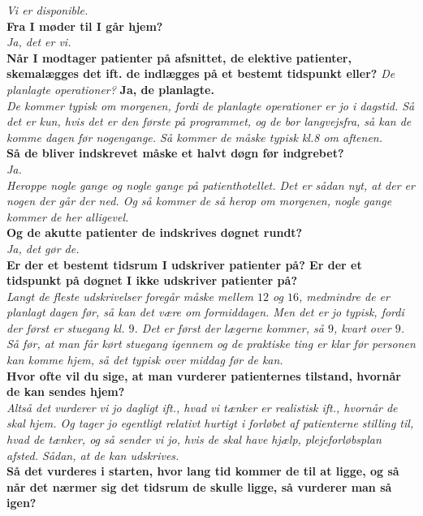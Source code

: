 \noindent
\textit{Vi er disponible.} \\
\noindent
\textbf{Fra I møder til I går hjem?} \\
\noindent
\textit{Ja, det er vi.}  \\
\noindent
\textbf{Når I modtager patienter på afsnittet, de elektive patienter, skemalægges det ift. de indlægges på et bestemt tidspunkt eller?}
\noindent
\textit{De planlagte operationer?}
\noindent
\textbf{Ja, de planlagte.} \\
\noindent
\textit{De kommer typisk om morgenen, fordi de planlagte operationer er jo i dagstid. Så det er kun, hvis det er den første på programmet, og de bor langvejsfra, så kan de komme dagen før nogengange. Så kommer de måske typisk kl.8 om aftenen.} \\
\noindent
\textbf{Så de bliver indskrevet måske et halvt døgn før indgrebet?} \\
\noindent
\textit{Ja.} \\
\noindent
\textit{Heroppe nogle gange og nogle gange på patienthotellet. Det er sådan nyt, at der er nogen der går der ned. Og så kommer de så herop om morgenen, nogle gange kommer de her alligevel.} \\
\noindent
\textbf{Og de akutte patienter de indskrives døgnet rundt?} \\
\noindent
\textit{Ja, det gør de.} \\
\noindent
\textbf{Er der et bestemt tidsrum I udskriver patienter på? Er der et tidspunkt på døgnet I ikke udskriver patienter på?} \\
\noindent
\textit{Langt de fleste udskrivelser foregår måske mellem $12$ og $16$, medmindre de er planlagt dagen før, så kan det være om formiddagen. Men det er jo typisk, fordi der først er stuegang kl. $9$. Det er først der lægerne kommer, så $9$, kvart over $9$. Så før, at man får kørt stuegang igennem og de praktiske ting er klar før personen kan komme hjem, så det typisk over middag før de kan.} \\
\noindent
\textbf{Hvor ofte vil du sige, at man vurderer patienternes tilstand, hvornår de kan sendes hjem?}  \\
\noindent
\textit{Altså det vurderer vi jo dagligt ift., hvad vi tænker er realistisk ift., hvornår de skal hjem. Og tager jo egentligt relativt hurtigt i forløbet af patienterne stilling til, hvad de tænker, og så sender vi jo, hvis de skal have hjælp, plejeforløbsplan afsted. Sådan, at de kan udskrives.} \\
\noindent
\textbf{Så det vurderes i starten, hvor lang tid kommer de til at ligge, og så når det nærmer sig det tidsrum de skulle ligge, så vurderer man så igen?} \\
